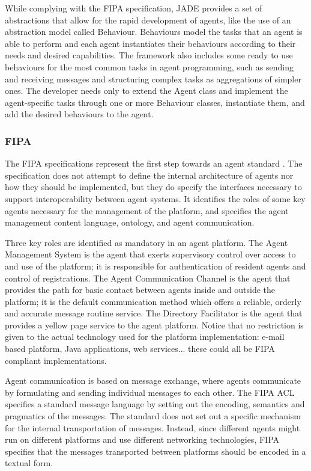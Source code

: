 While complying with the \ac{FIPA} specification, \ac{JADE} provides a set of abstractions that allow for the rapid development of agents, like the use of an abstraction model called Behaviour. 
Behaviours model the tasks that an agent is able to perform and each agent instantiates their behaviours according to their needs and desired capabilities.
The framework also includes some ready to use behaviours for the most common tasks in agent programming, such as sending and receiving messages and structuring complex tasks as aggregations of simpler ones.
The developer needs only to extend the Agent class and implement the agent-specific tasks through one or more Behaviour classes, instantiate them, and add the desired behaviours to the agent.

\subsubsection*{FIPA}
\label{subsubsection:FIPA}

\noindent The \ac{FIPA} specifications represent the first step towards an agent standard \cite{obrien:FIPA}.
The specification does not attempt to define the internal architecture of agents nor how they should be implemented, but they do specify the interfaces necessary to support interoperability between agent systems.
It identifies the roles of some key agents necessary for the management of the platform, and specifies the agent management content language, ontology, and agent communication.

Three key roles are identified as mandatory in an agent platform.
The Agent Management System is the agent that exerts supervisory control over access to and use of the  platform; it is responsible for authentication of resident agents and control of registrations.
The Agent Communication Channel is the agent that provides the path for basic contact between agents inside and outside the platform; it is the default communication method which offers a reliable, orderly and accurate message routine service.
The Directory Facilitator is the agent that provides a yellow page service to the agent platform.
Notice that no restriction is given to the actual technology used for the platform implementation: e-mail based platform, Java applications, web services... these could all be FIPA compliant implementations.

Agent communication is based on message exchange, where agents communicate by formulating and sending individual messages to each other.
The \ac{FIPA} \ac{ACL} specifies a standard message language by setting out the encoding, semantics and pragmatics of the messages.
The standard does not set out a specific mechanism for the internal transportation of messages.
Instead, since different agents might run on different platforms and use different networking technologies, \ac{FIPA} specifies that the messages  transported  between  platforms  should  be  encoded  in  a  textual  form.

